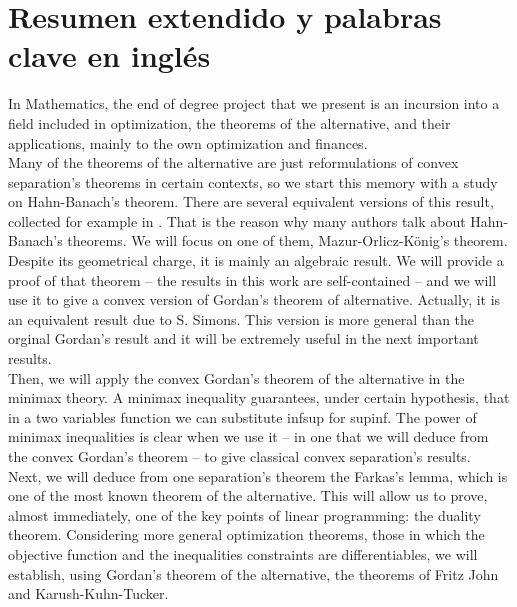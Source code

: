 \chapter{Resumen extendido y palabras clave en inglés}
In Mathematics, the end of degree project that we present is an incursion into a field included in optimization, the theorems of the alternative, and their applications, mainly to the own optimization and finances.\\

Many of the theorems of the alternative are just reformulations of convex separation's theorems in certain contexts, so we start this memory with a study on Hahn-Banach's theorem. There are several equivalent versions of this result, collected for example in \cite{schechter1996handbook}. That is the reason why many authors talk about Hahn-Banach's theorems. We will focus on one of them, Mazur-Orlicz-König's theorem. Despite its geometrical charge, it is mainly an algebraic result. We will provide a proof of that theorem -- the results in this work are self-contained --  and we will use it to give a convex version  of Gordan's theorem of alternative. Actually, it is an equivalent result due to S. Simons. This version is more general than the orginal Gordan's result and it will be extremely useful in the next important results. \\ 

Then, we will apply the convex Gordan's theorem of the alternative in the minimax theory. A minimax inequality guarantees, under certain hypothesis, that in a two variables function we can substitute inf\hspace{0.5mm}sup for sup\hspace{0.5mm}inf. The power of minimax inequalities is clear when we use it -- in one that we will deduce from the convex Gordan's theorem -- to give classical convex separation's results. \\

Next, we will deduce from one separation's theorem the Farkas's lemma, which is one of the most known theorem of the alternative. This will allow us to prove, almost immediately, one of the key points of linear programming: the duality theorem. Considering more general optimization theorems, those in which the objective function and the inequalities constraints are differentiables, we will establish, using Gordan's theorem of the alternative, the theorems of Fritz John and Karush-Kuhn-Tucker.\\

